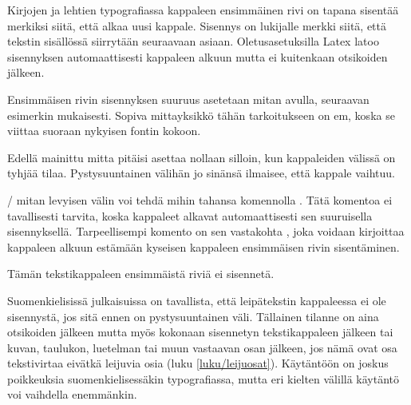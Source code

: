 Kirjojen ja lehtien typografiassa kappaleen ensimmäinen rivi on tapana
sisentää merkiksi siitä, että alkaa uusi kappale. Sisennys on lukijalle
merkki siitä, että tekstin sisällössä siirrytään seuraavaan asiaan.
Oletusasetuksilla Latex latoo sisennyksen automaattisesti kappaleen
alkuun mutta ei kuitenkaan otsikoiden jälkeen.

Ensimmäisen rivin sisennyksen suuruus asetetaan mitan 
avulla, seuraavan esimerkin mukaisesti. Sopiva mittayksikkö tähän
tarkoitukseen on em, koska se viittaa suoraan nykyisen fontin kokoon.

\begin{koodilohkosis}
\setlength{\parindent}{1em}
\end{koodilohkosis}

\noindent
Edellä mainittu mitta pitäisi asettaa nollaan silloin, kun kappaleiden
välissä on tyhjää tilaa. Pystysuuntainen välihän jo sinänsä ilmaisee,
että kappale vaihtuu.

\begin{koodilohkosis}
\setlength{\parskip}{1.3ex plus .2ex minus .1ex}
\setlength{\parindent}{0em}  %
\end{koodilohkosis}

\noindent
{}\-/ mitan levyisen välin voi tehdä mihin tahansa
komennolla . Tätä komentoa ei tavallisesti tarvita,
koska kappaleet alkavat automaattisesti sen suuruisella sisennyksellä.
Tarpeellisempi komento on sen vastakohta , joka
voidaan kirjoittaa kappaleen alkuun estämään kyseisen kappaleen
ensimmäisen rivin sisentäminen.

\begin{koodilohkosis}
\noindent
Tämän tekstikappaleen ensimmäistä riviä ei sisennetä.
\end{koodilohkosis}

\noindent
Suomenkielisissä julkaisuissa on tavallista, että leipätekstin
kappaleessa ei ole sisennystä, jos sitä ennen on pystysuuntainen väli.
Tällainen tilanne on aina otsikoiden jälkeen mutta myös kokonaan
sisennetyn tekstikappaleen jälkeen tai kuvan, taulukon, luetelman tai
muun vastaavan osan jälkeen, jos nämä ovat osa tekstivirtaa eivätkä
leijuvia osia (luku \ref{luku/leijuosat}). Käytäntöön on joskus
poikkeuksia suomenkielisessäkin typografiassa, mutta eri kielten välillä
käytäntö voi vaihdella enemmänkin.

